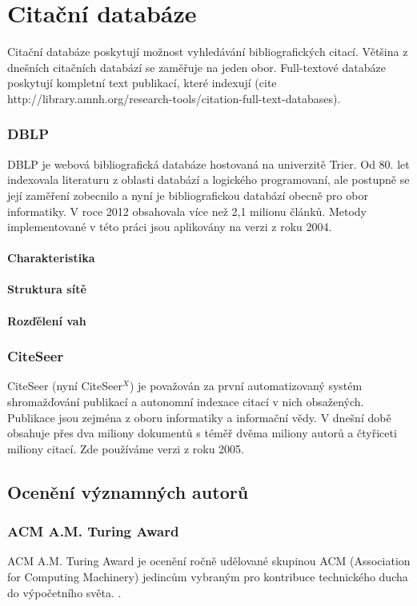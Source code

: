 \documentclass[12pt,titlepage]{report}
\begin{document}
\chapter{Citační databáze}
Citační databáze poskytují možnost vyhledávání bibliografických citací. Většina
z dnešních citačních databází se zaměřuje na jeden obor. Full-textové databáze
poskytují kompletní text publikací, které indexují (cite
http://library.amnh.org/research-tools/citation-full-text-databases).

\subsection{DBLP}
DBLP \cite{DBLP} je webová bibliografická databáze hostovaná na univerzitě
Trier. Od 80.  let indexovala literaturu z oblasti databází a logického
programovaní, ale postupně se její zaměření zobecnilo a nyní je bibliografickou
databází obecně pro obor informatiky. V roce 2012 obsahovala více než 2,1
milionu článků. Metody implementované v této práci jsou aplikovány na verzi z
roku 2004. 

\subsubsection{Charakteristika}
\subsubsection{Struktura sítě}
\subsubsection{Rozďělení vah}

\subsection{CiteSeer}
CiteSeer (nyní CiteSeer$^X$) \cite{citeseer} je považován za první
automatizovaný systém shromažďování publikací a autonomní indexace citací v
nich obsažených. Publikace jsou zejména z oboru informatiky a informační vědy.
V dnešní době obsahuje přes dva miliony dokumentů s téměř dvěma miliony autorů
a čtyřiceti miliony citací. Zde používáme verzi z roku 2005.
\section{Ocenění významných autorů}
\subsection{ACM A.M. Turing Award}
ACM A.M. Turing Award je ocenění ročně udělované skupinou ACM (Association for
Computing Machinery) jedincům vybraným pro kontribuce technického ducha do
výpočetního světa.
\cite{turingaward}.
\end{document}
